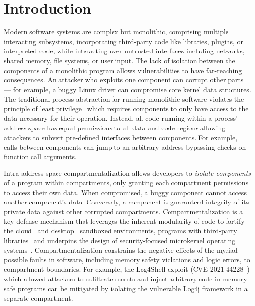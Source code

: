 \section{Introduction}
\label{sec:seccells:intro}

Modern software systems are complex but monolithic, 
comprising multiple interacting subsystems,
incorporating third-party code like libraries, plugins, or interpreted code,
while interacting over untrusted 
interfaces including networks, shared memory, file systems, or user input.
The lack of isolation between the components of a monolithic program 
allows vulnerabilities to have far-reaching consequences.
An attacker who exploits one component can corrupt other parts ---
for example, a buggy Linux driver can compromise
core kernel data structures.
The traditional process abstraction for running monolithic software
violates the principle of least privilege~\cite{SaltzerS75}
which requires components to only have access to the data necessary
for their operation.
Instead, all code running within a process' address space has 
equal permissions to all data and code regions
allowing attackers to subvert pre-defined interfaces between components.
For example, calls between components can jump to an arbitrary address
bypassing checks on function call arguments.

Intra-address space compartmentalization allows developers to 
\emph{isolate components} of a program within compartments, 
only granting each compartment permissions to access their own data.
When compromised, a buggy component cannot access another
component's data.
Conversely, a component is guaranteed integrity of its private
data against other corrupted compartments.
Compartmentalization is a key defense mechanism that leverages the 
inherent modularity of code to 
fortify the cloud~\cite{v8isolates,ShillakerP20,miller2021} and 
desktop~\cite{fffission} sandboxed environments, 
programs with third-party libraries~\cite{GhosnKPLB21}%
and underpins the design of security-focused microkernel operating
systems~\cite{RozierAABGGHKLLN88, Hildebrand92, LevinCCPW75, GolubDFR90}.
Compartmentalization constrains the negative effects of the myriad possible faults 
in software, 
including memory safety violations and logic errors, 
to compartment boundaries.
For example, the Log4Shell exploit (CVE-2021-44228~\cite{cve202144228}) which
allowed attackers to exfiltrate secrets and inject arbitrary code in
memory-safe programs can be mitigated by isolating the vulnerable Log4j framework
in a separate compartment.

